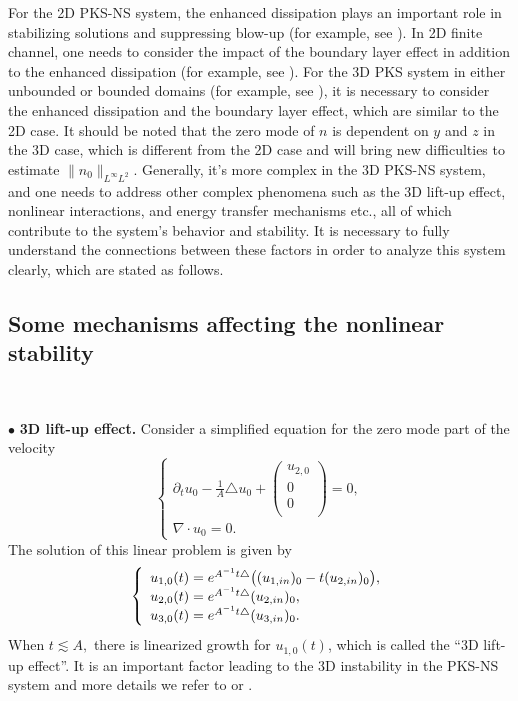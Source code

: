 \documentclass[12pt, reqno]{amsart}
\numberwithin{equation}{section}
\begin{document}
	For the 2D PKS-NS system, the enhanced dissipation plays an
	important role in stabilizing solutions and suppressing blow-up (for example, see \cite{he05,zeng}).
	In 2D finite channel, one needs to consider the impact of the boundary layer effect in addition to the enhanced dissipation  (for example, see \cite{cui1}).
	For the 3D PKS system in either unbounded or bounded domains (for example, see \cite{Bedro2,wangweike2}), it is necessary to consider the enhanced dissipation and the boundary layer effect, which are similar to the 2D case. It should be noted that the zero mode of $n$ is dependent on $y$ and $z$ in the 3D case, which is different from the 2D case and will bring new difficulties to estimate $\|n_0\|_{L^{\infty}L^2}.$
	Generally, it's more complex in the 3D PKS-NS system, and one needs to address other complex phenomena such as the 3D lift-up effect, nonlinear interactions, and  energy transfer mechanisms etc., all of which contribute to the system's behavior and stability. It is necessary to fully understand the connections between these factors in order to analyze this system clearly, which are stated as follows.
	
	
	\subsection{Some mechanisms affecting the nonlinear stability}
	\
	
	\noindent$\bullet$ \textbf{3D lift-up effect.}
	Consider a simplified equation for the zero mode part of the velocity
	\begin{equation*}
		\left\{
		\begin{array}{lr}
			\partial_tu_0-\frac{1}{A}\triangle u_0+\left(
			\begin{array}{c}
				u_{2,0} \\
				0 \\
				0 \\
			\end{array}
			\right)
			=0, \\
			\nabla \cdot u_0=0.
		\end{array}
		\right.
	\end{equation*} 
	The solution of this linear problem is given by
	\begin{equation*}
		\left\{
		\begin{array}{lr}
			u_{1,0}(t)=e^{{A}^{-1} t \triangle }\big( (u_{1,{\rm in}})_0-t(u_{2,{\rm in}})_0 \big),\\
			u_{2,0}(t)=e^{{A}^{-1} t \triangle }(u_{2,{\rm in}})_0,\\
			u_{3,0}(t)=e^{{A}^{-1} t \triangle }(u_{3,{\rm in}})_0.
		\end{array}
		\right.
	\end{equation*} 
	When $t\lesssim A,$ there is linearized growth for $u_{1,0}(t)$, which is called the ``3D lift-up effect''. It is an important factor leading to the 3D instability in the PKS-NS system and more details we refer to \cite{Bedro1} or \cite{wei2}. 
	
\end{document}
